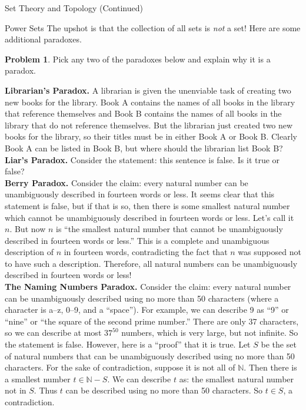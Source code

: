 \documentclass[11pt]{article}
\theoremstyle{definition}
\newtheorem{problem}[theorem]{Problem}
\begin{document}
\begin{section}{Set Theory and Topology (Continued)}
\begin{subsection}{Power Sets}
The upshot is that the collection of all sets is \emph{not} a set!  Here are some additional paradoxes.

\begin{problem}
Pick any two of the paradoxes below and explain why it is a paradox.
\end{problem}

\bigskip

\noindent \textbf{Librarian's Paradox.} A librarian is given the unenviable task of creating two new books for the library. Book A contains the names of all books in the library that reference themselves and Book B contains the names of all books in the library that do not reference themselves. But the librarian just created two new books for the library, so their titles must be in either Book A or Book B. Clearly Book A can be listed in Book B, but where should the librarian list Book B?\\

\noindent \textbf{Liar's Paradox.} Consider the statement: this sentence is false. Is it true or false?\\

\noindent \textbf{Berry Paradox.} Consider the claim: every natural number can be unambiguously described in fourteen words or less. It seems clear that this statement is false, but if that is so, then there is some smallest natural number which cannot be unambiguously described in fourteen words or less. Let's call it $n$. But now $n$ is ``the smallest natural number that cannot be unambiguously described in fourteen words or less.'' This is a complete and unambiguous description of $n$ in fourteen words, contradicting the fact that $n$ was supposed not to have such a description. Therefore, all natural numbers can be unambiguously described in fourteen words or less!\\

\noindent \textbf{The Naming Numbers Paradox.} Consider the claim: every natural number can be unambiguously described using no more than 50 characters (where a character is a--z, 0--9, and a ``space''). For example, we can describe 9 as ``9'' or ``nine'' or ``the square of the second prime number.'' There are only 37 characters, so we can describe at most $37^{50}$ numbers, which is very large, but not infinite. So the statement is false. However, here is a ``proof'' that it is true. Let $S$ be the set of natural numbers that can be unambiguously described using no more than 50 characters. For the sake of contradiction, suppose it is not all of $\mathbb{N}$. Then there is a smallest number $t\in\mathbb{N}-S$. We can describe $t$ as: the smallest natural number not in $S$.  Thus $t$ can be described using no more than 50 characters. So $t\in S$, a contradiction.\\


\end{subsection}
\end{section}
\end{document}
